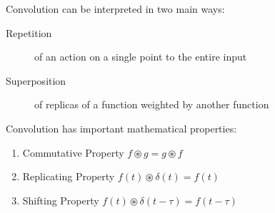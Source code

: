 
Convolution can be interpreted in two main ways:
\begin{description}
	\item[Repetition] of an action on a single point to the entire input
	\item[Superposition] of replicas of a function weighted by another function
\end{description}

Convolution has important mathematical properties:
\begin{enumerate}
	\item Commutative Property $f \circledast g = g \circledast f$
	\item Replicating Property $f(t) \circledast \delta(t) = f(t)$
	\item Shifting Property $ f(t) \circledast \delta(t-\tau) = f(t-\tau)$	
\end{enumerate}

